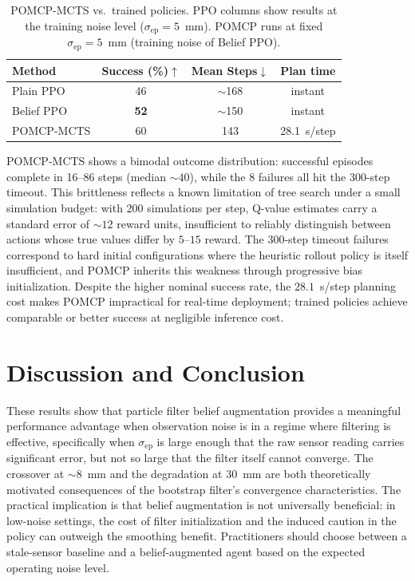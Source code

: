 \documentclass[conference]{IEEEtran}
\newcommand{\sigmaep}{\sigma_{\text{ep}}}
\begin{document}
\begin{table}[!t]
  \caption{POMCP-MCTS vs.\ trained policies. PPO columns show results at the
           training noise level ($\sigmaep = 5$~mm). POMCP runs at fixed
           $\sigmaep = 5$~mm (training noise of Belief PPO).}
  \label{tab:pomcp}
  \centering
  \begin{tabular}{l ccc}
    \toprule
    Method & Success (\%)$\uparrow$ & Mean Steps$\downarrow$ & Plan time \\
    \midrule
    Plain PPO   & 46 & $\sim$168 & instant \\
    Belief PPO  & \textbf{52} & $\sim$150 & instant \\
    POMCP-MCTS  & 60 & 143       & 28.1~s/step \\
    \bottomrule
  \end{tabular}
\end{table}

POMCP-MCTS shows a bimodal outcome distribution: successful episodes
complete in 16--86 steps (median $\sim\!40$), while the 8 failures all
hit the 300-step timeout.
This brittleness reflects a known limitation of tree search under a
small simulation budget: with 200 simulations per step, Q-value estimates
carry a standard error of $\sim\!12$ reward units, insufficient to reliably
distinguish between actions whose true values differ by $5$--$15$ reward.
The 300-step timeout failures correspond to hard initial configurations
where the heuristic rollout policy is itself insufficient, and POMCP inherits
this weakness through progressive bias initialization.
Despite the higher nominal success rate, the $28.1$~s/step planning cost
makes POMCP impractical for real-time deployment; trained policies achieve
comparable or better success at negligible inference cost.

\section{Discussion and Conclusion}
\label{sec:conclusion}

These results show that particle filter belief augmentation provides a meaningful
performance advantage when observation noise is in a regime where filtering is
effective, specifically when $\sigmaep$ is large enough that the raw sensor
reading carries significant error, but not so large that the filter itself
cannot converge.
The crossover at $\sim\!8$~mm and the degradation at $30$~mm are both
theoretically motivated consequences of the bootstrap filter's convergence
characteristics.
The practical implication is that belief augmentation is not universally
beneficial: in low-noise settings, the cost of filter initialization and
the induced caution in the policy can outweigh the smoothing benefit.
Practitioners should choose between a stale-sensor baseline and a
belief-augmented agent based on the expected operating noise level.
\end{document}
